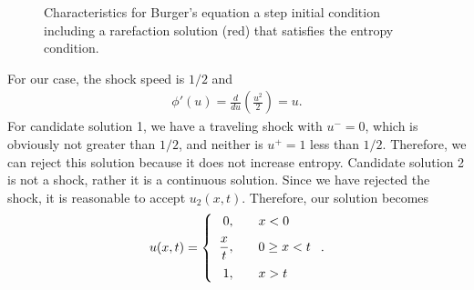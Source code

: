 \begin{figure}[tb!]
\begin{center}
\caption{Characteristics for Burger's equation a step initial condition including a rarefaction solution (red) that satisfies the entropy condition.}
\label{Fig:pde_burgerEquationCharacteristics_Rarefaction}
\end{center}
\end{figure}


For our case, the shock speed is $1/2$ and
\begin{align}
  \phi'(u) = \frac{d}{du} \left( \frac{u^2}{2} \right) = u .
\end{align}
For candidate solution 1, we have a traveling shock with $u^- = 0$, which is obviously not greater than $1/2$, and neither is $u^+ = 1$ less than $1/2$. Therefore, we can reject this solution because it does not increase entropy. Candidate solution 2 is not a shock, rather it is a continuous solution. Since we have rejected the shock, it is reasonable to accept $u_2(x,t)$. Therefore, our solution becomes
\begin{align}
  u(x,t) = \left\{ \begin{array}{r l}
  0, & \quad x < 0 \vspace{0.2cm} \\
  \dfrac{x}{t}, & \quad 0 \ge x < t \vspace{0.2cm}  \\
  1, & \quad x > t \\ \end{array} \right. .
\end{align}


